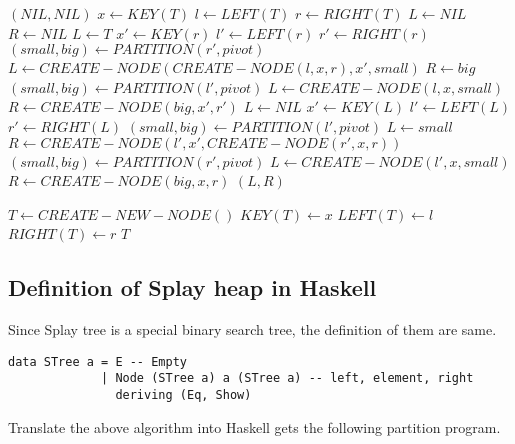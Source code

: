 \documentclass{article}
\begin{document}
\begin{algorithmic}[1]
    \State \Return $(NIL, NIL)$
  \EndIf
  \State $x \gets KEY(T)$
  \State $l \gets LEFT(T)$
  \State $r \gets RIGHT(T)$
  \State $L \gets NIL$
  \State $R \gets NIL$
      \State $L \gets T$
    \Else
      \State $x' \gets KEY(r)$
      \State $l' \gets LEFT(r)$
      \State $r' \gets RIGHT(r)$
        \State $(small, big) \gets PARTITION(r', pivot)$
        \State $L \gets CREATE-NODE(CREATE-NODE(l, x, r), x', small)$
        \State $R \gets big$
      \Else
        \State $(small, big) \gets PARTITION(l', pivot)$
        \State $L \gets CREATE-NODE(l, x, small)$
        \State $R \gets CREATE-NODE(big, x', r')$
      \EndIf
    \EndIf
  \Else
      \State $L \gets NIL$
    \Else
      \State $x' \gets KEY(L)$
      \State $l' \gets LEFT(L)$
      \State $r' \gets RIGHT(L)$
        \State $(small, big) \gets PARTITION(l', pivot)$
        \State $L \gets small$
        \State $R \gets CREATE-NODE(l', x', CREATE-NODE(r', x, r))$
      \Else
        \State $(small, big) \gets PARTITION(r', pivot)$
        \State $L \gets CREATE-NODE(l', x, small)$
        \State $R \gets CREATE-NODE(big, x, r)$
      \EndIf
    \EndIf
  \EndIf
  \State \Return $(L, R)$
\EndFunction

  \State $T \gets CREATE-NEW-NODE()$
  \State $KEY(T) \gets x$
  \State $LEFT(T) \gets l$
  \State $RIGHT(T) \gets r$
  \State \Return $T$
\EndFunction
\end{algorithmic}

\subsection*{Definition of Splay heap in Haskell}

Since Splay tree is a special binary search tree, the definition of
them are same.

\lstset{language=Haskell}
\begin{lstlisting}
data STree a = E -- Empty
             | Node (STree a) a (STree a) -- left, element, right
               deriving (Eq, Show)
\end{lstlisting}

Translate the above algorithm into Haskell gets the following partition
program.
\end{document}
